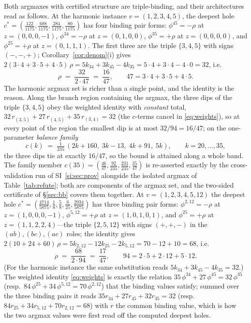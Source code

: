 \documentclass[11pt,a4paper]{article}
\numberwithin{equation}{section}
\theoremstyle{plain}
\theoremstyle{definition}
\theoremstyle{remark}
\begin{document}
Both argmaxes with certified structure are triple-binding, and their
architectures read
as follows. At the harmonic instance $v=(1,2,3,4,5)$, the deepest hole
$c^{*}=(\tfrac{122}{1175},\tfrac{688}{1175},\tfrac{284}{1175},
\tfrac{80}{1175})$ has four binding pair forms:
$\phi^{45}=-\rho$ at $z=(0,0,0,-1)$, $\phi^{34}=-\rho$ at
$z=(0,1,0,0)$, $\phi^{35}=+\rho$ at $z=(0,0,0,0)$, and
$\phi^{25}=+\rho$ at $z=(0,1,1,1)$. The first three are the triple
$\{3,4,5\}$ with signs $(-,-,+)$; Corollary~\ref{cor:denom}(i) gives
$2(3\cdot4+3\cdot5+4\cdot5)\,\rho=5k_{34}+3k_{45}-4k_{35}
=5\cdot4+3\cdot4-4\cdot0=32$, i.e.
\[
\rho\;=\;\frac{32}{2\cdot 47}\;=\;\frac{16}{47},
\qquad 47=3\cdot4+3\cdot5+4\cdot5.
\]
The harmonic argmax set is richer than a single point, and the identity
is the reason. Along the branch region containing the argmax, the three
dips of the triple $\{3,4,5\}$ obey the weighted identity with
\emph{constant} total,
$32\,r_{(3,5)}+27\,r_{(4,5)}+35\,r_{(3,4)}=32$ (the $c$-terms cancel
in \eqref{eq:weights}), so at every point of the region the smallest
dip is at most $32/94=16/47$; on the one-parameter \emph{balance
family}
\[
c(k)\;=\;\tfrac{1}{235}\,(2k{+}160,\;3k{-}13,\;4k{+}91,\;5k),
\qquad k=20,\dots,35,
\]
the three dips tie at exactly $16/47$, so the bound is attained along a
whole band. The family member $c(35)=(\tfrac{46}{47},
\tfrac{92}{235},\tfrac{231}{235},\tfrac{35}{47})$ is re-asserted
exactly by the cross-validation run of SI~\ref{si:sec:prov}
alongside the isolated argmax of Table~\ref{tab:refute}; both are
components of the argmax set, and the two-sided certificate of
\S\ref{sec:bb} covers them together.
At $v=(1,2,3,4,5,12)$ the deepest hole
$c^{*}=(\tfrac{4714}{5875},\tfrac18,\tfrac58,\tfrac6{25},
\tfrac{2034}{5875})$ has three binding pair forms: $\phi^{2,12}=-\rho$
at $z=(1,0,0,0,-1)$, $\phi^{5,12}=+\rho$ at $z=(1,0,1,0,1)$, and
$\phi^{25}=+\rho$ at $z=(1,1,2,2,4)$---the triple $\{2,5,12\}$ with
signs $(+{,}+{,}-)$ in the $(ab),(bc),(ac)$ roles; the identity gives
$2(10+24+60)\,\rho=5k_{2,12}-12k_{25}-2k_{5,12}=70-12+10=68$, i.e.
\[
\rho\;=\;\frac{68}{2\cdot 94}\;=\;\frac{17}{47},
\qquad 94=2\cdot5+2\cdot12+5\cdot12.
\]
(For the harmonic instance the same substitution reads
$5k_{34}+3k_{45}-4k_{35}=32$.)
The weighted identity \eqref{eq:weights} is exactly the relation
$35\,\phi^{34}+27\,\phi^{45}=32\,\phi^{35}$ (resp.\
$84\,\phi^{25}+34\,\phi^{5,12}=70\,\phi^{2,12}$) that the binding
values satisfy; summed over the three binding pairs it reads
$35r_{34}+27r_{45}+32r_{35}=32$ (resp.\ $84r_{25}+34r_{5,12}+70r_{2,12}
=68$) with $r$ the common binding value, which is how the two argmax
values were first read off the computed deepest holes.
\end{document}
